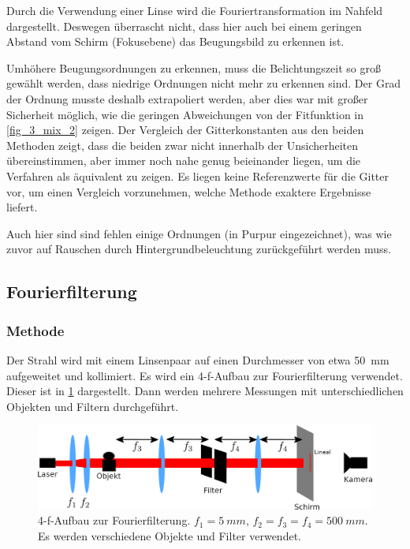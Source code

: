 \documentclass[
	a4paper,
	12pt,
	pagesize,
	ngerman
]{scrartcl}
\begin{document}
Durch die Verwendung einer Linse wird die Fouriertransformation im Nahfeld dargestellt. %
Deswegen überrascht nicht, dass hier auch bei einem geringen Abstand vom Schirm (Fokusebene) das Beugungsbild zu erkennen ist.

Umhöhere Beugungsordnungen zu erkennen, muss die Belichtungszeit so groß gewählt werden, dass niedrige Ordnungen nicht mehr zu erkennen sind.
Der Grad der Ordnung musste deshalb extrapoliert werden, aber dies war mit großer Sicherheit möglich, wie die geringen Abweichungen von der Fitfunktion in \cref{fig_3_mix_2} zeigen.
Der Vergleich der Gitterkonstanten aus den beiden Methoden zeigt, dass die beiden zwar nicht innerhalb der Unsicherheiten übereinstimmen, aber immer noch nahe genug beieinander liegen, um die Verfahren als äquivalent zu zeigen.
Es liegen keine Referenzwerte für die Gitter vor, um einen Vergleich vorzunehmen, welche Methode exaktere Ergebnisse liefert.

Auch hier sind sind fehlen einige Ordnungen (in Purpur eingezeichnet), was wie zuvor auf Rauschen durch Hintergrundbeleuchtung zurückgeführt werden muss.

	\subsection{Fourierfilterung}

	\subsubsection*{Methode}

		Der Strahl wird mit einem Linsenpaar auf einen Durchmesser von etwa \SI{50}{mm} aufgeweitet und kollimiert.
		Es wird ein 4-f-Aufbau zur Fourierfilterung verwendet.
		Dieser ist in \cref{fig_4f} dargestellt.
		Dann werden mehrere Messungen mit unterschiedlichen Objekten und Filtern durchgeführt.

	\begin{figure}[H]
			\includegraphics[width=1\linewidth]{img/4f}
			\caption{
				4-f-Aufbau zur Fourierfilterung. $f_1= \SI{5}{mm}$, $f_2 = f_3 = f_4 = \SI{500}{mm}$. Es werden verschiedene Objekte und Filter verwendet.
			}
			\label{fig_4f}
	\end{figure}
\end{document}
